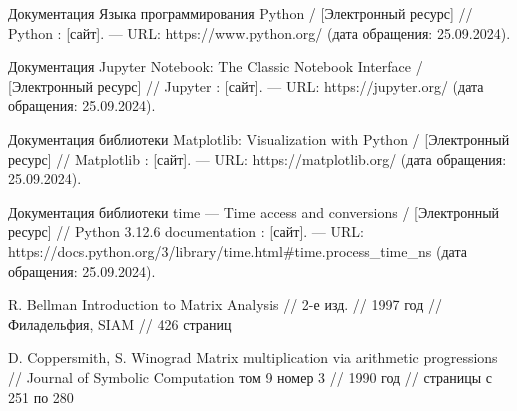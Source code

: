 \begin{thebibliography}{}
   Документация Языка программирования Python /  [Электронный ресурс] // Python : [сайт]. — URL: https://www.python.org/ (дата обращения: 25.09.2024).
  
   Документация Jupyter Notebook: The Classic Notebook Interface /  [Электронный ресурс] // Jupyter : [сайт]. — URL: https://jupyter.org/ (дата обращения: 25.09.2024).

   Документация библиотеки Matplotlib: Visualization with Python /  [Электронный ресурс] // Matplotlib : [сайт]. — URL: https://matplotlib.org/ (дата обращения: 25.09.2024).
  
   Документация библиотеки time — Time access and conversions /  [Электронный ресурс] // Python 3.12.6 documentation : [сайт]. — URL: https://docs.python.org/3/library/time.html\#time.process\_time\_ns (дата обращения: 25.09.2024).
  
   R. Bellman Introduction to Matrix Analysis // 2-е изд. // 1997 год // Филадельфия, SIAM // 426 страниц

   D. Coppersmith, S. Winograd Matrix multiplication via arithmetic progressions // Journal of Symbolic Computation том 9 номер 3 // 1990 год // страницы с 251 по 280

\end{thebibliography}